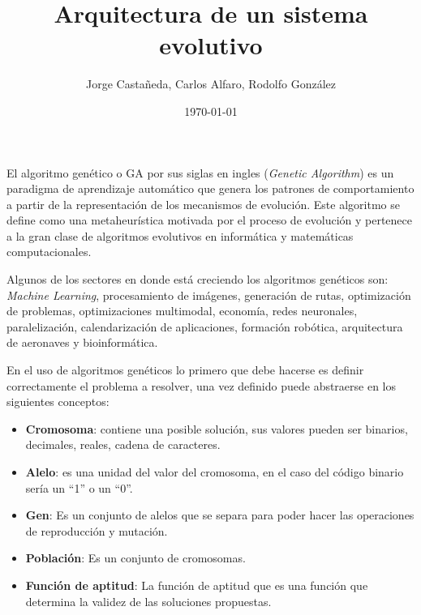 \documentclass[10pt,twocolumn,a4paper]{articuloAPA}
\author{Jorge Castañeda, Carlos Alfaro, Rodolfo González}
\title{Arquitectura de un sistema evolutivo}%
\date{\today}
\begin{document}

El algoritmo genético o GA por sus siglas en ingles (\textit{Genetic Algorithm}) es un paradigma de aprendizaje automático que genera los patrones de comportamiento a partir de la representación de los mecanismos de evolución. Este algoritmo se define como una metaheurística motivada por el proceso de evolución y pertenece a la gran clase de algoritmos evolutivos en informática y matemáticas computacionales.

Algunos de los sectores en donde está creciendo los algoritmos genéticos son: \textit{Machine Learning}, procesamiento de imágenes, generación de rutas, optimización de problemas, optimizaciones multimodal, economía, redes neuronales, paralelización, calendarización de aplicaciones, formación robótica, arquitectura de aeronaves y bioinformática.

En el uso de algoritmos genéticos lo primero que debe hacerse es definir correctamente el problema a resolver, una vez definido puede abstraerse en los siguientes conceptos:

\begin{itemize}
  \item \textbf{Cromosoma}: contiene una posible solución, sus valores pueden ser binarios, decimales, reales, cadena de caracteres.
  \item \textbf{Alelo}: es una unidad del valor del cromosoma, en el caso del código binario sería un ``1'' o un ``0''.
  \item \textbf{Gen}: Es un conjunto de alelos que se separa para poder hacer las operaciones de reproducción y mutación.
  \item \textbf{Población}: Es un conjunto de cromosomas.
  \item \textbf{Función de aptitud}: La función de aptitud que es una función que determina la validez de las soluciones propuestas.
\end{itemize} 
\end{document}
